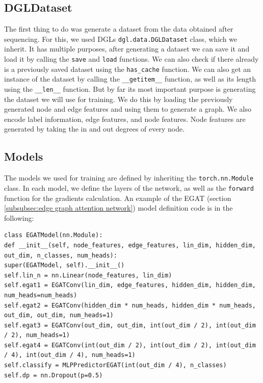\documentclass[times, utf8, diplomski, english]{fer_eng}
\begin{document}
\subsection{DGLDataset}

The first thing to do was generate a dataset from the data obtained after sequencing. For this, we used DGLs \texttt{dgl.data.DGLDataset} class, which we inherit. It has multiple purposes, after generating a dataset we can save it and load it by calling the \texttt{save} and \texttt{load} functions. We can also check if there already is a previously saved dataset using the \texttt{has\_cache} function. We can also get an instance of the dataset by calling the \texttt{\_\_getitem\_\_} function, as well as its length using the \texttt{\_\_len\_\_} function. But by far its most important purpose is generating the dataset we will use for training. We do this by loading the previously generated node and edge features and using them to generate a graph. We also encode label information, edge features, and node features. Node features are generated by taking the in and out degrees of every node.

\subsection{Models}

The models we used for training are defined by inheriting the \texttt{torch.nn.Module} class. In each model, we define the layers of the network, as well as the \texttt{forward} function for the gradients calculation. An example of the EGAT (section \ref{subsubsec:edge graph attention network}) model definition code is in the following:

\begin{lstlisting}
class EGATModel(nn.Module):
def __init__(self, node_features, edge_features, lin_dim, hidden_dim, out_dim, n_classes, num_heads):
super(EGATModel, self).__init__()
self.lin_n = nn.Linear(node_features, lin_dim)
self.egat1 = EGATConv(lin_dim, edge_features, hidden_dim, hidden_dim, num_heads=num_heads)
self.egat2 = EGATConv(hidden_dim * num_heads, hidden_dim * num_heads, out_dim, out_dim, num_heads=1)
self.egat3 = EGATConv(out_dim, out_dim, int(out_dim / 2), int(out_dim / 2), num_heads=1)
self.egat4 = EGATConv(int(out_dim / 2), int(out_dim / 2), int(out_dim / 4), int(out_dim / 4), num_heads=1)
self.classify = MLPPredictorEGAT(int(out_dim / 4), n_classes)
self.dp = nn.Dropout(p=0.5)
\end{lstlisting}
\end{document}
